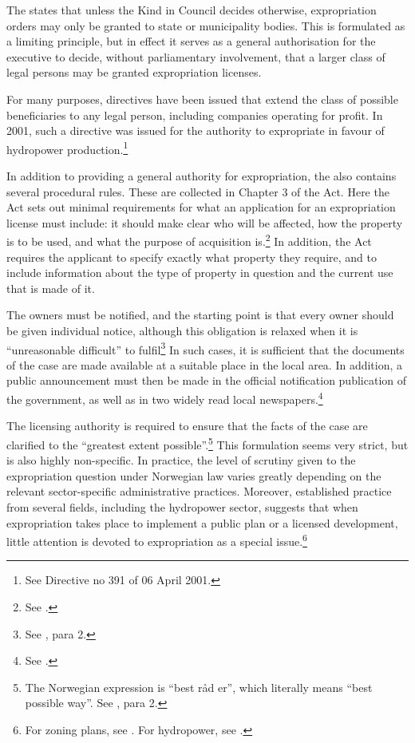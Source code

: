The \cite{ea59} states that unless the Kind in Council decides otherwise, expropriation orders may only be granted to state or municipality bodies. This is formulated as a limiting principle, but in effect it serves as a general authorisation for the executive to decide, without parliamentary involvement, that a larger class of legal persons may be granted expropriation licenses. 

For many purposes, directives have been issued that extend the class of possible beneficiaries to any legal person, including companies operating for profit. In 2001, such a directive was issued for the authority to expropriate in favour of hydropower production.\footnote{See Directive no 391 of 06 April 2001.} 

In addition to providing a general authority for expropriation, the \cite{ea59} also contains several procedural rules. These are collected in Chapter 3 of the Act. Here the Act sets out minimal requirements for what an application for an expropriation license must include: it should make clear who will be affected, how the property is to be used, and what the purpose of acquisition is.\footnote{See \cite[11]{ea59}.} In addition, the Act requires the applicant to specify exactly what property they require, and to include information about the type of property in question and the current use that is made of it.

The owners must be notified, and the starting point is that every owner should be given individual notice, although this obligation is relaxed when it is ``unreasonable difficult'' to fulfil\footnote{See \cite[12]{ea59}, para 2.} In such cases, it is sufficient that the documents of the case are made available at a suitable place in the local area. In addition, a public announcement must then  be made in the official notification publication of the government, as well as in two widely read local newspapers.\footnote{See \cite[12]{ea59}.}

The licensing authority is required to ensure that the facts of the case are clarified to the ``greatest extent possible''.\footnote{The Norwegian expression is ``best råd er'', which literally means ``best possible way''. See \cite[12]{ea59}, para 2.} This formulation seems very strict, but is also highly non-specific. In practice, the level of scrutiny given to the expropriation question under Norwegian law varies greatly depending on the relevant sector-specific administrative practices. Moreover, established practice from several fields, including the hydropower sector, suggests that when expropriation takes place to implement a public plan or a licensed development, little attention is devoted to expropriation as a special issue.\footnote{For zoning plans, see \cite{namsos98,bo99}. For hydropower, see \cite{jorpeland11}.}

